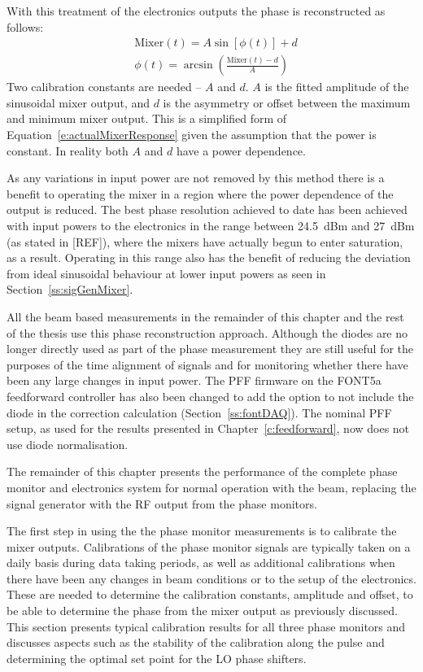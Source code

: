 With this treatment of the electronics outputs the phase is reconstructed as follows:
\begin{align}
&\mathrm{Mixer}(t) = A\sin[\phi(t)] + d \\
&\phi(t) = \arcsin\left(\frac{\mathrm{Mixer}(t)-d}{A}\right)
\label{e:phaseRecUsed}
\end{align}
Two calibration constants are needed -- \(A\) and \(d\). \(A\) is the fitted amplitude of the sinusoidal mixer output, and \(d\) is the asymmetry or offset between the maximum and minimum mixer output. This is a simplified form of Equation~\ref{e:actualMixerResponse} given the assumption that the power is constant. In reality both \(A\) and \(d\) have a power dependence.

As any variations in input power are not removed by this method there is a benefit to operating the mixer in a region where the power dependence of the output is reduced. The best phase resolution achieved to date has been achieved with input powers to the electronics in the range between 24.5~dBm and 27~dBm (as stated in [REF]), where the mixers have actually begun to enter saturation, as a result. Operating in this range also has the benefit of reducing the deviation from ideal sinusoidal behaviour at lower input powers as seen in Section~\ref{ss:sigGenMixer}.

All the beam based measurements in the remainder of this chapter and the rest of the thesis use this phase reconstruction approach. Although the diodes are no longer directly used as part of the phase measurement they are still useful for the purposes of the time alignment of signals and for monitoring whether there have been any large changes in input power. The PFF firmware on the FONT5a feedforward controller has also been changed to add the option to not include the diode in the correction calculation (Section~\ref{ss:fontDAQ}). The nominal PFF setup, as used for the results presented in Chapter~\ref{c:feedforward}, now does not use diode normalisation.


The remainder of this chapter presents the performance of the complete phase monitor and electronics system for normal operation with the beam, replacing the signal generator with the RF output from the phase monitors. 

The first step in using the the phase monitor measurements is to calibrate the mixer outputs. Calibrations of the phase monitor signals are typically taken on a daily basis during data taking periods, as well as additional calibrations when there have been any changes in beam conditions or to the setup of the electronics. These are needed to determine the calibration constants, amplitude and offset, to be able to determine the phase from the mixer output as previously discussed. This section presents typical calibration results for all three phase monitors and discusses aspects such as the stability of the calibration along the pulse and determining the optimal set point for the LO phase shifters. 

